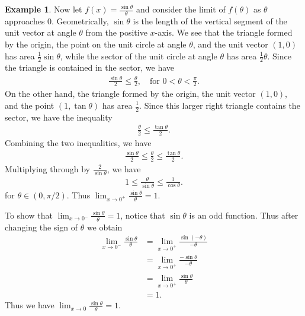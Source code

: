 \documentclass[11pt,oneside,reqno]{amsart}
\numberwithin{equation}{section}
\theoremstyle{definition}
\newtheorem{example}[theorem]{Example}
\theoremstyle{remark}
\begin{document}
\begin{example}\label{example:sinc}
    Now let $f(x) = \frac{\sin\theta}{\theta}$ and consider the limit of $f(\theta)$ as $\theta$ approaches $0$. Geometrically, $\sin\theta$ is the length of the vertical segment of the unit vector at angle 
    $\theta$ from the positive $x$-axis. We see that the triangle formed by the origin, the point on the unit circle at angle $\theta$, and the unit vector $(1,0)$ has area $\frac{1}{2}\sin\theta$, while
    the sector of the unit circle at angle $\theta$ has area $\frac{1}{2}\theta$. Since the triangle is contained in the sector, we have 
    \begin{align*}
        \frac{\sin\theta}{2} \leq \frac{\theta}{2}, \quad \text{for } 0 < \theta < \frac{\pi}{2}.
    \end{align*}
    On the other hand, the triangle formed by the origin, the unit vector $(1,0)$, and the point $(1, \tan\theta)$ has area $\frac{1}{2}$. Since this larger right triangle contains the sector, we have the inequality
    \begin{align*}
        \frac{\theta}{2} \leq \frac{\tan\theta}{2}.
    \end{align*}
    Combining the two inequalities, we have
    \begin{align*}
        \frac{\sin\theta}{2} \leq \frac{\theta}{2} \leq \frac{\tan\theta}{2}.
    \end{align*}
    Multiplying through by $\frac{2}{\sin\theta}$, we have
    \begin{align*}
            1 \leq \frac{\theta}{\sin\theta} \leq \frac{1}{\cos\theta}.
    \end{align*}
    for $\theta \in (0, \pi/2)$. Thus $\lim_{x\to 0^+} \frac{\sin\theta}{\theta} = 1$. 

    To show that $\lim_{x\to0^-}\frac{\sin\theta}{\theta} = 1$, notice that $\sin\theta$ is an odd function. Thus after changing the sign of $\theta$ we obtain
    \begin{align*}
        \lim_{x\to0^-}\frac{\sin\theta}{\theta} &= \lim_{x\to0^+}\frac{\sin(-\theta)}{-\theta}
        \\&= \lim_{x\to0^+}\frac{-\sin\theta}{-\theta} \\&= \lim_{x\to0^+}\frac{\sin\theta}{\theta} \\&= 1.
    \end{align*}
    Thus we have $\lim_{x\to0} \frac{\sin\theta}{\theta} = 1$.
\end{example}
\end{document}
